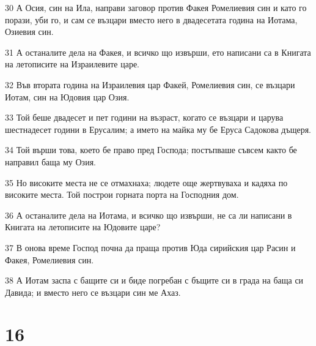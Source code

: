 \par 30 А Осия, син на Ила, направи заговор против Факея Ромелиевия син и като го порази, уби го, и сам се възцари вместо него в двадесетата година на Иотама, Озиевия син.
\par 31 А останалите дела на Факея, и всичко що извърши, ето написани са в Книгата на летописите на Израилевите царе.
\par 32 Във втората година на Израилевия цар Факей, Ромелиевия син, се възцари Иотам, син на Юдовия цар Озия.
\par 33 Той беше двадесет и пет години на възраст, когато се възцари и царува шестнадесет години в Ерусалим; а името на майка му бе Еруса Садокова дъщеря.
\par 34 Той върши това, което бе право пред Господа; постъпваше съвсем както бе направил баща му Озия.
\par 35 Но високите места не се отмахнаха; людете още жертвуваха и кадяха по високите места. Той построи горната порта на Господния дом.
\par 36 А останалите дела на Иотама, и всичко що извърши, не са ли написани в Книгата на летописите на Юдовите царе?
\par 37 В онова време Господ почна да праща против Юда сирийския цар Расин и Факея, Ромелиевия син.
\par 38 А Иотам заспа с бащите си и биде погребан с бъщите си в града на баща си Давида; и вместо него се възцари син ме Ахаз.

\chapter{16}

